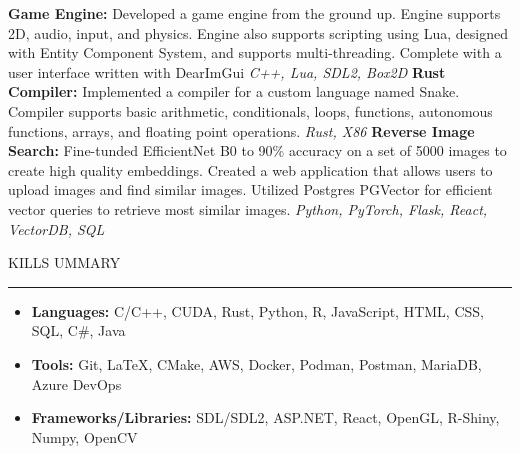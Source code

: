 \documentclass[11pt]{article}
\begin{document}
\textbf{Game Engine:} Developed a game engine from the ground up. Engine supports 2D, audio, input, and physics. Engine also supports scripting using Lua, designed with Entity Component System, and supports multi-threading. Complete with a user interface written with DearImGui   \hfill 
\textit{C++, Lua, SDL2, Box2D}
\newline
\textbf{Rust Compiler:} Implemented a compiler for a custom language named Snake. Compiler supports basic arithmetic, conditionals, loops, functions, autonomous functions, arrays, and floating point operations. \hfill \textit{Rust, X86}
\newline
\textbf{Reverse Image Search:} Fine-tunded EfficientNet B0 to 90\% accuracy on a set of 5000 images to create high quality embeddings. Created a web application that allows users to upload images and find similar images. Utilized Postgres PGVector for efficient vector queries to retrieve most similar images. \hfill \textit{Python, PyTorch, Flask, React, VectorDB, SQL}
\newline

\par \scalebox{1.3}{S}KILLS \scalebox{1.3}{S}UMMARY                  
\par \vspace{-0.1in} \noindent\rule{7.8in}{0.5pt} 

\begin{itemize}
    \item \textbf{Languages:} \hspace*{3cm} C/C++, CUDA, Rust, Python, R, JavaScript, HTML, CSS, SQL, C\#, Java
    \item \textbf{Tools:} \hspace*{4cm} Git, \LaTeX, CMake, AWS, Docker, Podman, Postman, MariaDB, Azure DevOps
    \item \textbf{Frameworks/Libraries:} \hspace*{0.9cm}SDL/SDL2, ASP.NET, React, OpenGL, R-Shiny, Numpy, OpenCV
\end{itemize}
\end{document}
